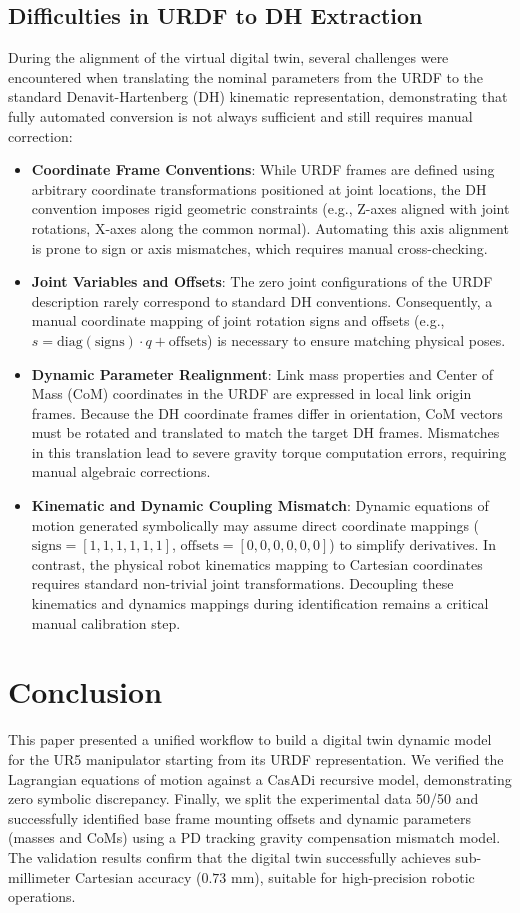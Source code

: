\documentclass[journal]{IEEEtran}
\begin{document}
\subsection{Difficulties in URDF to DH Extraction}
During the alignment of the virtual digital twin, several challenges were encountered when translating the nominal parameters from the URDF to the standard Denavit-Hartenberg (DH) kinematic representation, demonstrating that fully automated conversion is not always sufficient and still requires manual correction:
\begin{itemize}
    \item \textbf{Coordinate Frame Conventions}: While URDF frames are defined using arbitrary coordinate transformations positioned at joint locations, the DH convention imposes rigid geometric constraints (e.g., Z-axes aligned with joint rotations, X-axes along the common normal). Automating this axis alignment is prone to sign or axis mismatches, which requires manual cross-checking.
    \item \textbf{Joint Variables and Offsets}: The zero joint configurations of the URDF description rarely correspond to standard DH conventions. Consequently, a manual coordinate mapping of joint rotation signs and offsets (e.g., $s = \text{diag}(\text{signs}) \cdot q + \text{offsets}$) is necessary to ensure matching physical poses.
    \item \textbf{Dynamic Parameter Realignment}: Link mass properties and Center of Mass (CoM) coordinates in the URDF are expressed in local link origin frames. Because the DH coordinate frames differ in orientation, CoM vectors must be rotated and translated to match the target DH frames. Mismatches in this translation lead to severe gravity torque computation errors, requiring manual algebraic corrections.
    \item \textbf{Kinematic and Dynamic Coupling Mismatch}: Dynamic equations of motion generated symbolically may assume direct coordinate mappings ($\text{signs} = [1,1,1,1,1,1]$, $\text{offsets} = [0,0,0,0,0,0]$) to simplify derivatives. In contrast, the physical robot kinematics mapping to Cartesian coordinates requires standard non-trivial joint transformations. Decoupling these kinematics and dynamics mappings during identification remains a critical manual calibration step.
\end{itemize}

\section{Conclusion}
This paper presented a unified workflow to build a digital twin dynamic model for the UR5 manipulator starting from its URDF representation. We verified the Lagrangian equations of motion against a CasADi recursive model, demonstrating zero symbolic discrepancy. Finally, we split the experimental data 50/50 and successfully identified base frame mounting offsets and dynamic parameters (masses and CoMs) using a PD tracking gravity compensation mismatch model. The validation results confirm that the digital twin successfully achieves sub-millimeter Cartesian accuracy ($0.73$ mm), suitable for high-precision robotic operations.

\end{document}
